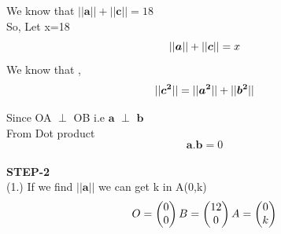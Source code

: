 \documentclass[10pt,a4paper]{report}
\begin{document}
\begin{multicols}{2}
\vspace{3mm} 
We know that $||\boldsymbol{a}|| + ||\boldsymbol{c}||= 18 $\vspace{2mm}\\
So, Let x=18 
\begin{equation}
   ||\boldsymbol{a}|| + ||\boldsymbol{c}||= x \vspace{2mm}
\end{equation}
We know that , \\
\begin{equation}
||\boldsymbol{c^2}|| = ||\boldsymbol{a^2}|| + ||\boldsymbol{b^2}|| \vspace{2mm}
\end{equation}

Since OA $\perp$ OB  i.e $\boldsymbol{a}$ $\perp$  $\boldsymbol{b}$ \\\vspace{3mm}
From Dot product \\
\begin{equation}
\boldsymbol{a}.\boldsymbol{b} = 0 
\end{equation}\vspace{2mm}\\

\textbf{STEP-2}\vspace{2mm}\\
(1.) If we find $\boldsymbol{||a||}$  we can get k in A(0,k) \\\vspace{2mm}
\begin{equation}
    O=\begin{pmatrix}
0\\
0
\end{pmatrix} 
    B=\begin{pmatrix}
12\\
0
\end{pmatrix} 
    A=\begin{pmatrix}
0\\
k
 \end{pmatrix}  \vspace{3mm}
\end{equation}
  

\end{multicols}
\end{document}
